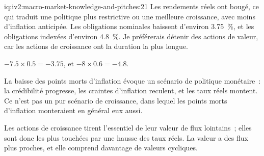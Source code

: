 \begin{solution}{iq:iv2:macro-market-knowledge-and-pitches:21}
Les rendements réels ont bougé, ce qui traduit une politique plus restrictive ou une meilleure croissance, avec moins d'inflation anticipée. Les obligations nominales baissent d'environ 3.75~\%, et les obligations indexées d'environ 4.8~\%. Je préférerais détenir des actions de valeur, car les actions de croissance ont la duration la plus longue.

$-7.5 \times 0.5 = -3.75$, et $-8 \times 0.6 = -4.8$.

La baisse des points morts d'inflation évoque un scénario de politique monétaire~: la crédibilité progresse, les craintes d'inflation reculent, et les taux réels montent. Ce n'est pas un pur scénario de croissance, dans lequel les points morts d'inflation monteraient en général eux aussi.

Les actions de croissance tirent l'essentiel de leur valeur de flux lointains~; elles sont donc les plus touchées par une hausse des taux réels. La valeur a des flux plus proches, et elle comprend davantage de valeurs cycliques.

\end{solution}


